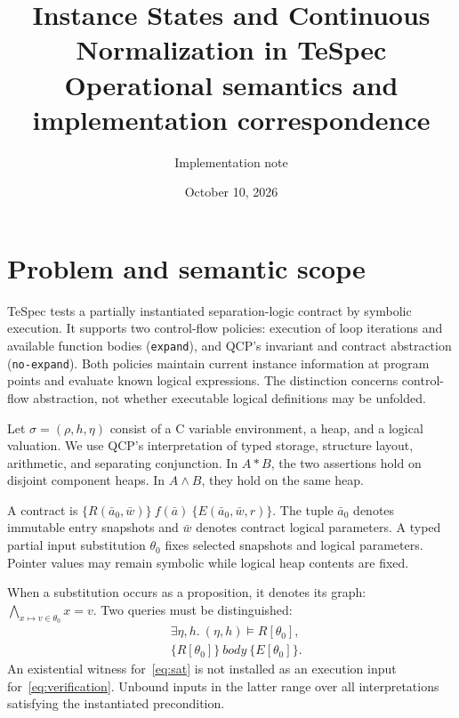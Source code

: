\documentclass[10pt]{article}
\title{Instance States and Continuous Normalization in TeSpec\\
\large Operational semantics and implementation correspondence}
\author{Implementation note}
\date{October 10, 2026}
\begin{document}
\maketitle

\section{Problem and semantic scope}
TeSpec tests a partially instantiated separation-logic contract by symbolic
execution. It supports two control-flow policies: execution of loop iterations
and available function bodies (\texttt{expand}), and QCP's invariant and
contract abstraction (\texttt{no-expand}). Both policies maintain current
instance information at program points and evaluate known logical expressions.
The distinction concerns control-flow abstraction, not whether executable
logical definitions may be unfolded.

Let $\sigma=(\rho,h,\eta)$ consist of a C variable environment, a heap, and a
logical valuation. We use QCP's interpretation of typed storage, structure
layout, arithmetic, and separating conjunction. In $A*B$, the two assertions
hold on disjoint component heaps. In $A\land B$, they hold on the same heap.

A contract is $\{R(\bar a_0,\bar w)\}\ f(\bar a)\ \{E(\bar a_0,\bar w,r)\}$.
The tuple $\bar a_0$ denotes immutable entry snapshots and $\bar w$ denotes
contract logical parameters. A typed partial input substitution $\theta_0$
fixes selected snapshots and logical parameters. Pointer values may remain
symbolic while logical heap contents are fixed.

When a substitution occurs as a proposition, it denotes its graph:
$\bigwedge_{x\mapsto v\in\theta_0}x=v$.
Two queries must be distinguished:
\begin{align}
 &\exists\eta,h.\ (\eta,h)\models R[\theta_0], \label{eq:sat}\\
 &\{R[\theta_0]\}\ \mathit{body}\ \{E[\theta_0]\}. \label{eq:verification}
\end{align}
An existential witness for~\eqref{eq:sat} is not installed as an execution input
for~\eqref{eq:verification}. Unbound inputs in the latter range over all
interpretations satisfying the instantiated precondition.
\end{document}

